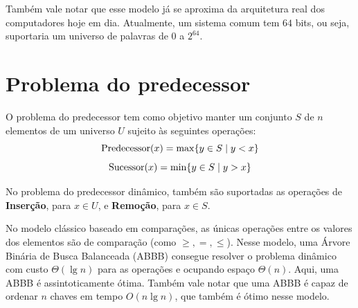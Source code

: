 Também vale notar que esse modelo já se aproxima da arquitetura real dos
computadores hoje em dia. Atualmente, um sistema comum tem $64$ bits, ou seja,
suportaria um universo de palavras de $0$ a $2^{64}$.


\section{Problema do predecessor}

O problema do predecessor tem como objetivo manter um conjunto $S$ de $n$
elementos de um universo $U$ sujeito às seguintes operações:
\[
\operatorname{Predecessor}(x) = \max \{y \in S \mid y < x \} 
\]
\[
\operatorname{Sucessor}(x) = \min \{y \in S \mid y > x \}
\]

No problema do predecessor dinâmico, também são suportadas as operações de
\textbf{Inserção}, para $x \in U$, e \textbf{Remoção}, para $x \in S$.

No modelo clássico baseado em comparações, as únicas operações entre os valores
dos elementos são de comparação (como $\geq, =, \leq$). Nesse modelo, uma Árvore
Binária de Busca Balanceada (ABBB) consegue resolver o problema dinâmico com
custo $\Theta (\lg n)$ para as operações e ocupando espaço $\Theta (n)$. Aqui,
uma ABBB é assintoticamente ótima. Também vale notar que uma ABBB é capaz de
ordenar $n$ chaves em tempo $O(n \lg n)$, que também é ótimo nesse modelo.
